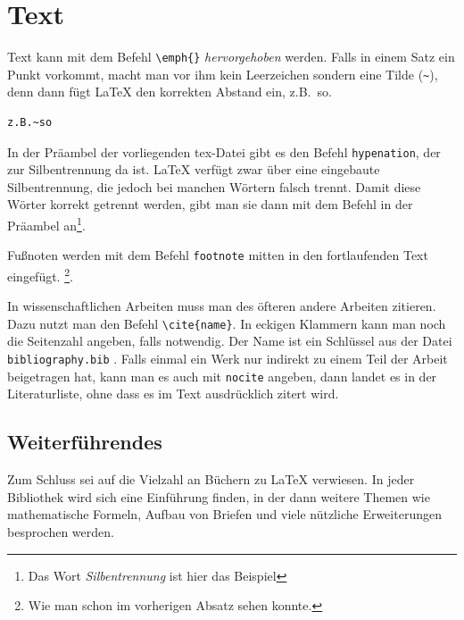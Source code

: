 \section{Text}
\label{ch:illustrationen:sec:text}

Text kann mit dem Befehl \verb|\emph{}| \emph{hervorgehoben} werden.
Falls in einem Satz ein Punkt vorkommt, macht man vor ihm kein Leerzeichen sondern eine Tilde (\verb|~|), denn dann fügt \LaTeX{} den korrekten Abstand ein, z.B.~so.

\begin{verbatim}
z.B.~so
\end{verbatim}

In der Präambel der vorliegenden tex-Datei gibt es den Befehl \verb|hypenation|, der zur Silbentrennung da ist.
\LaTeX{} verfügt zwar über  eine eingebaute Silbentrennung, die jedoch bei manchen Wörtern falsch trennt.
Damit diese Wörter korrekt getrennt werden, gibt man sie dann mit dem Befehl in der Präambel an\footnote{Das Wort \emph{Silbentrennung} ist hier das Beispiel}.

Fußnoten werden mit dem Befehl \verb|footnote| mitten in den fortlaufenden Text eingefügt. \footnote{Wie man schon im vorherigen Absatz sehen konnte.}.

In wissenschaftlichen Arbeiten muss man des öfteren andere Arbeiten zitieren.
Dazu nutzt man den Befehl \verb|\cite{name}|.
In eckigen Klammern kann man noch die Seitenzahl angeben, falls notwendig.
Der Name ist ein Schlüssel aus der Datei \verb|bibliography.bib| \cite[S.~10]{kopka}.
Falls einmal ein Werk nur indirekt zu einem Teil der Arbeit beigetragen hat, kann man es auch mit \verb|nocite| angeben, dann landet es in der Literaturliste, ohne dass es im Text ausdrücklich zitert wird.

\subsection{Weiterführendes}

Zum Schluss sei auf die Vielzahl an Büchern zu \LaTeX{} verwiesen.
In jeder Bibliothek wird sich eine Einführung finden, in der dann weitere Themen wie mathematische Formeln, Aufbau von Briefen und viele nützliche Erweiterungen besprochen werden.
